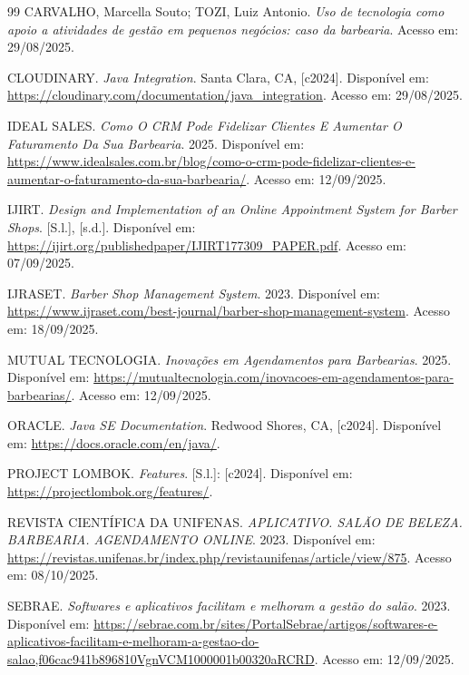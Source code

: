 \documentclass[
    12pt, 
    a4paper, 
    oneside, 
    chapter=TITLE, 
    section=TITLE
]{abntex2}
\begin{document}
\begin{thebibliography}{99}
    CARVALHO, Marcella Souto; TOZI, Luiz Antonio. \textit{Uso de tecnologia como apoio a atividades de gestão em pequenos negócios: caso da barbearia}. Acesso em: 29/08/2025.

    CLOUDINARY. \textit{Java Integration}. Santa Clara, CA, [c2024]. Disponível em: \url{https://cloudinary.com/documentation/java_integration}. Acesso em: 29/08/2025.

    IDEAL SALES. \textit{Como O CRM Pode Fidelizar Clientes E Aumentar O Faturamento Da Sua Barbearia}. 2025. Disponível em: \url{https://www.idealsales.com.br/blog/como-o-crm-pode-fidelizar-clientes-e-aumentar-o-faturamento-da-sua-barbearia/}. Acesso em: 12/09/2025.

    IJIRT. \textit{Design and Implementation of an Online Appointment System for Barber Shops}. [S.l.], [s.d.]. Disponível em: \url{https://ijirt.org/publishedpaper/IJIRT177309_PAPER.pdf}. Acesso em: 07/09/2025.

    IJRASET. \textit{Barber Shop Management System}. 2023. Disponível em: \url{https://www.ijraset.com/best-journal/barber-shop-management-system}. Acesso em: 18/09/2025.

    MUTUAL TECNOLOGIA. \textit{Inovações em Agendamentos para Barbearias}. 2025. Disponível em: \url{https://mutualtecnologia.com/inovacoes-em-agendamentos-para-barbearias/}. Acesso em: 12/09/2025.

    ORACLE. \textit{Java SE Documentation}. Redwood Shores, CA, [c2024]. Disponível em: \url{https://docs.oracle.com/en/java/}.

    PROJECT LOMBOK. \textit{Features}. [S.l.]: [c2024]. Disponível em: \url{https://projectlombok.org/features/}.

    REVISTA CIENTÍFICA DA UNIFENAS. \textit{APLICATIVO. SALÃO DE BELEZA. BARBEARIA. AGENDAMENTO ONLINE}. 2023. Disponível em: \url{https://revistas.unifenas.br/index.php/revistaunifenas/article/view/875}. Acesso em: 08/10/2025.

    SEBRAE. \textit{Softwares e aplicativos facilitam e melhoram a gestão do salão}. 2023. Disponível em: \url{https://sebrae.com.br/sites/PortalSebrae/artigos/softwares-e-aplicativos-facilitam-e-melhoram-a-gestao-do-salao,f06cac941b896810VgnVCM1000001b00320aRCRD}. Acesso em: 12/09/2025.


\end{thebibliography}
\end{document}
